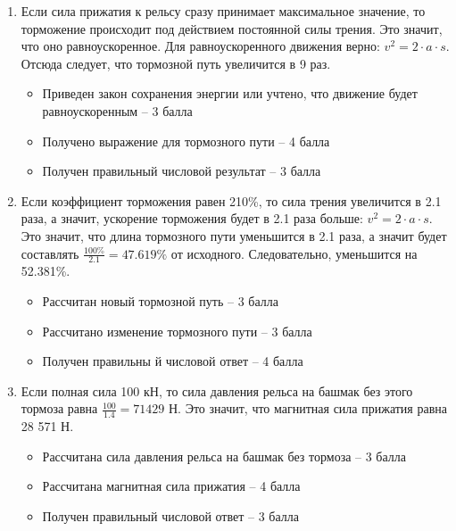 \solutionSection

\begin{enumerate}
    \item Если сила прижатия к рельсу сразу принимает максимальное значение, то торможение происходит под действием постоянной силы трения. Это значит, что оно равноускоренное. Для равноускоренного движения верно: $v^2=2 \cdot a \cdot s$.
    Отсюда следует, что тормозной путь увеличится в 9 раз. 
    

    \markSection

    \begin{itemize}
        \item Приведен закон сохранения энергии или учтено, что движение будет равноускоренным – 3 балла
        \item Получено выражение для тормозного пути – 4 балла
        \item Получен правильный числовой результат – 3 балла
    \end{itemize}

    \item Если коэффициент торможения равен 210\%, то сила трения увеличится в 2.1 раза, а значит, ускорение торможения будет в 2.1 раза больше: $v^2=2 \cdot a \cdot s$.
    Это значит, что длина тормозного пути уменьшится в 2.1 раза, а значит будет составлять $\frac{100 \%}{2.1}=47.619\%$ от исходного. Следовательно, уменьшится на 52.381\%.
    

    \markSection

    \begin{itemize}
	    \item Рассчитан новый тормозной путь – 3 балла
	    \item Рассчитано изменение тормозного пути – 3 балла
	    \item Получен правильны й числовой ответ – 4 балла
    \end{itemize}

    \item Если полная сила 100 кН, то сила давления рельса на башмак без этого тормоза равна $\frac{100}{1.4} = 71 429$ Н.  Это значит, что магнитная сила прижатия равна 28 571 Н.
    

    \markSection

    \begin{itemize}
	    \item Рассчитана сила давления рельса на башмак без тормоза – 3 балла
	    \item Рассчитана магнитная сила прижатия – 4 балла
	    \item Получен правильный числовой ответ – 3 балла
    \end{itemize}


\end{enumerate}
